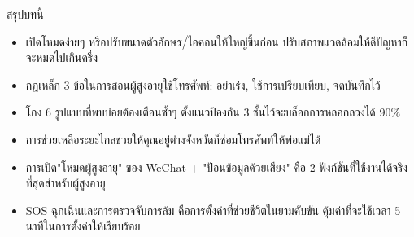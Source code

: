 \begin{tcbsummary}{สรุปบทนี้}
\begin{itemize}
  \item เปิดโหมดง่ายๆ หรือปรับขนาดตัวอักษร/ไอคอนให้ใหญ่ขึ้นก่อน ปรับสภาพแวดล้อมให้ดีปัญหาก็จะหมดไปเกินครึ่ง
  \item กฎเหล็ก 3 ข้อในการสอนผู้สูงอายุใช้โทรศัพท์: อย่าเร่ง, ใช้การเปรียบเทียบ, จดบันทึกไว้
  \item โกง 6 รูปแบบที่พบบ่อยต้องเตือนซ้ำๆ ตั้งแนวป้องกัน 3 ชั้นไว้จะบล็อกการหลอกลวงได้ 90\%
  \item การช่วยเหลือระยะไกลช่วยให้คุณอยู่ต่างจังหวัดก็ซ่อมโทรศัพท์ให้พ่อแม่ได้
  \item การเปิด"โหมดผู้สูงอายุ" ของ WeChat + "ป้อนข้อมูลด้วยเสียง" คือ 2 ฟังก์ชันที่ใช้งานได้จริงที่สุดสำหรับผู้สูงอายุ
  \item SOS ฉุกเฉินและการตรวจจับการล้ม คือการตั้งค่าที่ช่วยชีวิตในยามคับขัน คุ้มค่าที่จะใช้เวลา 5 นาทีในการตั้งค่าให้เรียบร้อย
\end{itemize}

\end{tcbsummary}
